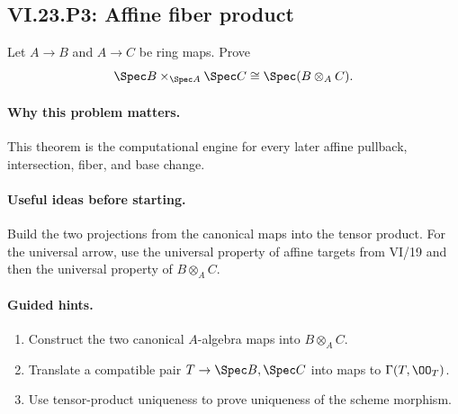 \subsection*{VI.23.P3: Affine fiber product}
\begin{problem}\label{prob:vi23-p03}
Let $A\to B$ and $A\to C$ be ring maps. Prove
\[
\Spec B\times_{\Spec A}\Spec C\cong\Spec(B\otimes_AC).
\]
\end{problem}

\ifdefined\FullProblemDossiers
\paragraph{Why this problem matters.}
This theorem is the computational engine for every later affine pullback, intersection, fiber, and base change.

\paragraph{Useful ideas before starting.}
Build the two projections from the canonical maps into the tensor product.  For the universal arrow, use the universal property of affine targets from VI/19 and then the universal property of $B\otimes_AC$.

\paragraph{Guided hints.}
\begin{enumerate}
\item Construct the two canonical $A$-algebra maps into $B\otimes_AC$.
\item Translate a compatible pair $T\to\Spec B,\Spec C$ into maps to $\Gamma(T,\OO_T)$.
\item Use tensor-product uniqueness to prove uniqueness of the scheme morphism.
\end{enumerate}

